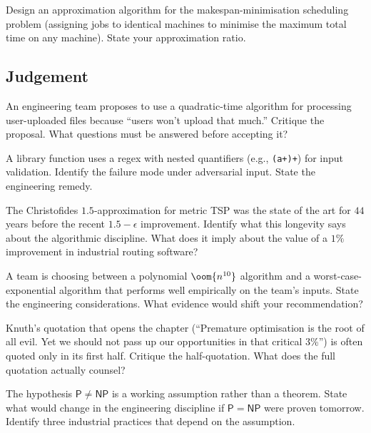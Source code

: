 \begin{exercise}
Design an approximation algorithm for the makespan-minimisation scheduling problem (assigning jobs to identical machines to minimise the maximum total time on any machine). State your approximation ratio.
\end{exercise}

\subsection*{Judgement}

\begin{exercise}
An engineering team proposes to use a quadratic-time algorithm for processing user-uploaded files because ``users won't upload that much.'' Critique the proposal. What questions must be answered before accepting it?
\end{exercise}

\begin{exercise}
A library function uses a regex with nested quantifiers (e.g., \texttt{(a+)+}) for input validation. Identify the failure mode under adversarial input. State the engineering remedy.
\end{exercise}

\begin{exercise}
The Christofides $1.5$-approximation for metric TSP was the state of the art for $44$ years before the recent $1.5 - \epsilon$ improvement. Identify what this longevity says about the algorithmic discipline. What does it imply about the value of a $1\%$ improvement in industrial routing software?
\end{exercise}

\begin{exercise}
A team is choosing between a polynomial $\oom{n^{10}}$ algorithm and a worst-case-exponential algorithm that performs well empirically on the team's inputs. State the engineering considerations. What evidence would shift your recommendation?
\end{exercise}

\begin{exercise}
Knuth's quotation that opens the chapter (``Premature optimisation is the root of all evil. Yet we should not pass up our opportunities in that critical 3\%'') is often quoted only in its first half. Critique the half-quotation. What does the full quotation actually counsel?
\end{exercise}

\begin{exercise}
The hypothesis $\mathsf{P} \neq \mathsf{NP}$ is a working assumption rather than a theorem. State what would change in the engineering discipline if $\mathsf{P} = \mathsf{NP}$ were proven tomorrow. Identify three industrial practices that depend on the assumption.
\end{exercise}

